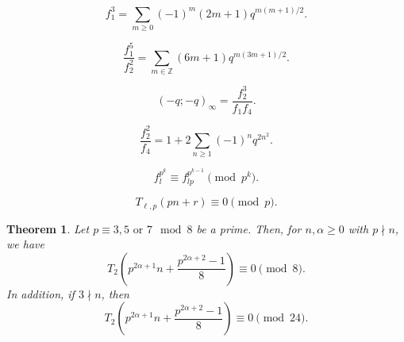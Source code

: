 \documentclass[10pt,a4paper]{amsart}
\newtheorem{theorem}{Theorem}
\begin{document}
\begin{equation}\label{f13}
    f_1^3=\sum_{m\ge 0}(-1)^m(2m+1)q^{m(m+1)/2}.
\end{equation}

  \begin{equation}\label{f15/f22}
        \frac{f_1^5}{f_2^2}=\sum_{m\in\mathbb{Z}}(6m+1)q^{m(3m+1)/2}.
    \end{equation}  

\begin{equation}\label{f1-q}
    (-q;-q)_\infty=\frac{f_2^3}{f_1 f_4}.
\end{equation}

\begin{equation}\label{f22/f4}
    \frac{f_2^2}{f_4}=1+2\sum\limits_{n\ge 1}(-1)^nq^{2n^2}.
\end{equation}

    \begin{equation}\label{modp^k}
        f_l^{p^k}\equiv f_{lp}^{p^{k-1}}\pmod{p^k}.
    \end{equation}

\begin{equation}\label{modp}
T_{\ell,p}(pn+r)\equiv0\pmod{p}.\end{equation}

\begin{theorem}\label{thm.p357mod8}
	Let $p\equiv3, 5 \text{ or } 7\mod 8$ be a prime. Then, for $n,\alpha\geq 0$ with $p\nmid n$, we have $$T_2\left(p^{2\alpha+1}n+\frac{p^{2\alpha+2}-1}{8}\right)\equiv0\pmod{8}.$$
In addition, if $3\nmid n$, then 
\begin{equation}\label{mod24}
T_2\left(p^{2\alpha+1}n+\frac{p^{2\alpha+2}-1}{8}\right)\equiv0\pmod{24}.\end{equation}
\end{theorem}
\end{document}
